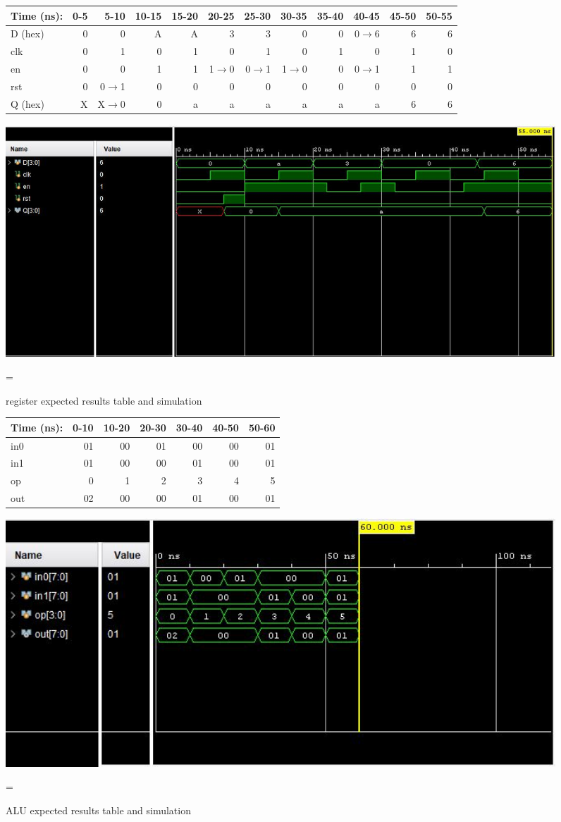 \documentclass[11pt]{article}
\begin{document}
\begin{figure}[ht]\centering
	\begin{tabular}{l|rrrrrrrrrrr}
		Time (ns): & 0-5 & 5-10 & 10-15 & 15-20 & 20-25 & 25-30 & 30-35 & 35-40
		& 40-45 & 45-50 & 50-55 \\
		\midrule
		D (hex) & 0 & 0     & A & A & 3         & 3       & 0           & 0 & 
		0$\to$6 & 6 & 6 \\
		clk     & 0 & 1     & 0 & 1 & 0         & 1       & 0           & 1 & 0 
		& 1 & 0 \\
		en    & 0 & 0       & 1 & 1 & 1$\to$0 & 0$\to$1 & 1$\to$0 & 0 & 0$\to$1
		& 1 & 1 \\
		rst   & 0 & 0$\to$1 & 0 & 0 & 0          & 0     & 0       & 0 & 0
		& 0 & 0 \\
		\midrule
		Q (hex) & X & X$\to$0 & 0 & a  & a & a & a & a & a & 6 & 6 \\
		\bottomrule
	\end{tabular}
	
	\includegraphics[width=1.0\textwidth]{Register Module}
	\caption{register expected results table and simulation}
	\label{fig:sim_with_table}=
\end{figure}
\clearpage


\begin{figure}[ht]\centering
	\begin{tabular}{l|rrrrrr}
		Time (ns): & 0-10 & 10-20 & 20-30 & 30-40 & 40-50 & 50-60 \\
		\midrule
		in0 & 01 & 00 & 01 &00  & 00 & 01 \\
		in1 & 01 & 00 & 00 & 01 & 00 & 01 \\
		op    & 0 & 1 & 2 & 3 & 4 & 5 \\
		\midrule
		out & 02 & 00 &00  & 01 & 00 & 01 \\
		\bottomrule
	\end{tabular}
	
	\includegraphics[width=1.0\textwidth]{ALU Module}
	\caption{ALU expected results table and simulation}
	\label{fig:sim_with_table}=
\end{figure}
\clearpage
\end{document}
